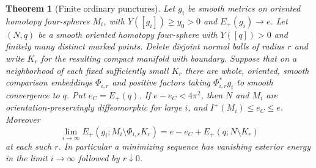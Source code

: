 \documentclass[11pt]{article}
\numberwithin{equation}{section}
\newtheorem{theorem}{Theorem}[section]
\theoremstyle{definition}
\theoremstyle{remark}
\begin{document}
\begin{theorem}[Finite ordinary punctures]\label{thm:finite-punctures}
Let \(g_i\) be smooth metrics on oriented homotopy
four-spheres \(M_i\), with \(Y([g_i])\ge y_0>0\) and
\(E_+(g_i)\to e\). Let \((N,q)\) be a smooth oriented homotopy
four-sphere with \(Y([q])>0\) and finitely many distinct marked
points. Delete disjoint normal balls of radius \(r\) and write
\(K_r\) for the resulting compact manifold with boundary.
Suppose that on a neighborhood of each fixed sufficiently small
\(K_r\) there are whole, oriented, smooth comparison embeddings
\(\Phi_{i,r}\) and positive factors taking \(\Phi_{i,r}^*g_i\)
to smooth convergence to \(q\). Put \(e_C=E_+(q)\). If
\(e-e_C<4\pi^2\), then \(N\) and \(M_i\) are orientation-preservingly
diffeomorphic for large \(i\), and \(I^+(M_i)\le e_C\le e\). Moreover
\begin{equation}\label{eq:exterior}
 \lim_{i\to\infty}E_+(g_i;M_i\setminus\Phi_{i,r}K_r)
   =e-e_C+E_+(q;N\setminus K_r)
\end{equation}
at each such \(r\). In particular a minimizing sequence has
vanishing exterior energy in the limit \(i\to\infty\) followed
by \(r\downarrow0\).
\end{theorem}
\end{document}
